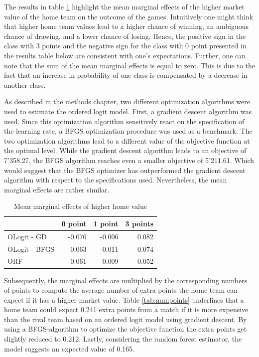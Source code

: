 \documentclass[11pt]{article}
\begin{document}
The results in table \ref{tab:MeanMarg} highlight the mean marginal effects of the higher market value of the home team on the outcome of the games.  Intuitively one might think that higher home team values lead to a higher chance of winning, an ambiguous chance of drawing, and a lower chance of losing. Hence, the positive sign in the class with 3 points and the negative sign for the class with 0 point presented in the results table below are consistent with one's expectations. Further, one can note that the sum of the mean marginal effects is equal to zero. This is due to the fact that an increase in probability of one class is compensated by a decrease in another class.

As described in the methods chapter, two different optimization algorithms were used to estimate the ordered logit model. First, a gradient descent algorithm was used. Since this optimization algorithm sensitively react on the specification of the learning rate, a BFGS optimization procedure was used as a benchmark. The two optimization algorithms lead to a different value of the objective function at the optimal level. While the gradient descent algorithm leads to an objective of 7'358.27, the BFGS algorithm reaches even a smaller objective of 5'211.61. Which would suggest that the BFGS optimizer has outperformed the gradient descent algorithm with respect to the specifications used. Nevertheless, the mean marginal effects are rather similar.

\begin{table}[ht]
\centering
	\begin{tabular}{lrrr}
	\toprule
	{} &   0 point &   1 point &  3 points \\
	\midrule
	OLogit - GD & -0.076 & -0.006 & 0.082 \\
	OLogit - BFGS & -0.063 & -0.011 & 0.074 \\
	ORF    & -0.061 &  0.009 &  0.052 \\
	\bottomrule
	\end{tabular}
	\caption{Mean marginal effects of higher home value}
	\label{tab:MeanMarg}
\end{table}

Subsequently, the marginal effects are multiplied by the corresponding numbers of points to compute the average number of extra points the home team can expect if it has a higher market value. Table \ref{tab:numpoints} underlines that a home team could expect 0.241 extra points from a match if it is more expensive than the rival team based on an ordered logit model using gradient descent. By using a BFGS-algorithm to optimize the objective function the extra points get slightly reduced to 0.212. Lastly, considering the random forest estimator, the model suggests an expected value of 0.165.
\end{document}
